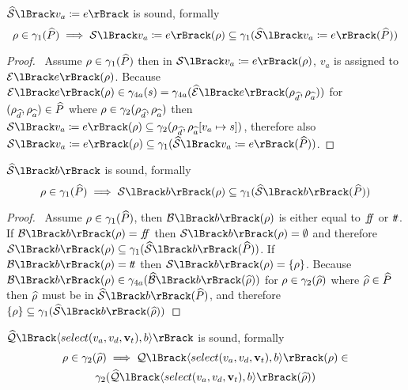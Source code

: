\begin{conjecture}
    \label{thm:sound-assign}
    $\abssem{v_a \coloneqq e}$ is sound, formally
    \begin{equation*}
    \environment \in \concrete_1(\ab{P}) \implies \sem{v_a \coloneqq e}(\environment) \subseteq \concrete_1(\abssem{v_a \coloneqq e}(\ab{P}))
    \end{equation*}
\end{conjecture}


\begin{proof}
    \pf\
    Assume $\rho \in \gamma_1(\widehat{P})$ then in $\sem{v_a \coloneqq e}(\environment)$, $v_a$ is assigned to $\expsem{e}(\environment)$.
    Because $\expsem{e}(\environment) \in \concrete_{4a}(s) = \concrete_{4a}(\absexpsem{e}(\env{\ab{d}}, \env{\ab{a}}))$ for $(\rho_{\widehat{d}}, \rho_{\widehat{a}}) \in \widehat{P}$ where $\rho \in \gamma_2(\rho_{\widehat{d}}, \rho_{\widehat{a}})$ then $\sem{v_a \coloneqq e}(\environment) \subseteq \concrete_2(\env{\ab{d}}, \env{\ab{a}}[v_a \mapsto s])$, therefore also $\sem{v_a \coloneqq e}(\environment) \subseteq \concrete_1(\abssem{v_a \coloneqq e}(\ab{P}))$.
\end{proof}


\begin{conjecture}
    \label{thm:sound-boolsem}
    $\abssem{b}$ is sound, formally
    \begin{equation*}
    \environment \in \concrete_1(\ab{P}) \implies \sem{b}(\environment) \subseteq \concrete_1(\abssem{b}(\ab{P}))
    \end{equation*}
\end{conjecture}


\begin{proof}
    \pf\
    Assume $\rho \in \gamma_1(\widehat{P})$, then $\boolsem{b}(\environment)$ is either equal to $f\!\!f$ or $t\!t$.
    If $\boolsem{b}(\environment) = \false$ then $\sem{b}(\environment) = \emptyset$ and therefore $\sem{b}(\environment) \subseteq \concrete_1(\abssem{b}(\ab{P}))$.
    If $\boolsem{b}(\environment) = \true$ then $\sem{b}(\environment) = \{ \environment \}$.
    Because $\boolsem{b}(\environment) \in \concrete_{4a}(\absboolsem{b}(\ab{\environment}))$ for $\rho \in \gamma_2(\widehat{\rho})$ where $\widehat{\rho} \in \widehat{P}$ then $\widehat{\rho}$ must be in $\abssem{b}(\ab{P})$, and therefore $\{ \environment \} \subseteq \concrete_1(\abssem{b}(\ab{\environment}))$
\end{proof}


\begin{conjecture}
    \label{thm:sound-select}
    $\abssqlsem{\langle select(v_a, v_d, \mathbf{v}_t), b \rangle}$ is sound, formally
    \begin{multline*}
        \environment \in \concrete_2(\ab{\environment}) \implies \sqlsem{\langle select(v_a, v_d, \mathbf{v}_t), b \rangle}(\environment) \in \\
        \concrete_2(\abssqlsem{\langle select(v_a, v_d, \mathbf{v}_t), b \rangle}(\ab{\environment}))
    \end{multline*}
\end{conjecture}


